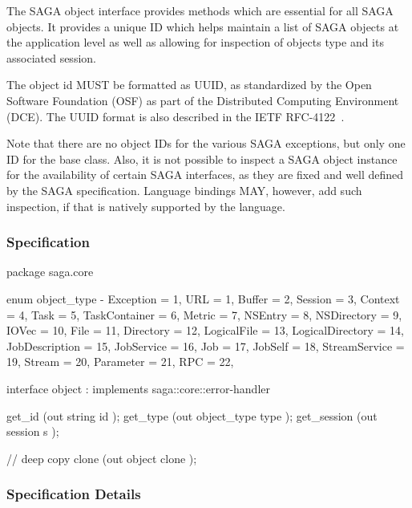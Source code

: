  
  The SAGA object interface provides methods which are essential
  for all SAGA objects.  It provides a unique ID which helps
  maintain a list of SAGA objects at the application level as
  well as allowing for inspection of objects type and its
  associated session.
        
  The object id MUST be formatted as UUID, as standardized by
  the Open Software Foundation (OSF) as part of the Distributed
  Computing Environment (DCE).  The UUID format is also
  described in the IETF RFC-4122~\cite{rfc-4122}.
 
  Note that there are no object IDs for the various
  SAGA exceptions, but only one ID for the 
  base class. Also, it is not possible to inspect a SAGA object
  instance for the availability of certain SAGA interfaces, as
  they are fixed and well defined by the SAGA specification.
  Language bindings MAY, however, add such inspection, if that
  is natively supported by the language.
 
 \subsubsection{Specification}
 
 \begin{myspec}
  package saga.core
  {
    enum object_type
    {
-     Exception        =   1,
      URL              =   1,
      Buffer           =   2,
      Session          =   3,
      Context          =   4,
      Task             =   5,
      TaskContainer    =   6,
      Metric           =   7,
      NSEntry          =   8,
      NSDirectory      =   9,
      IOVec            =  10,
      File             =  11,
      Directory        =  12,
      LogicalFile      =  13,
      LogicalDirectory =  14,
      JobDescription   =  15,
      JobService       =  16,
      Job              =  17,
      JobSelf          =  18,
      StreamService    =  19,
      Stream           =  20,
      Parameter        =  21,
      RPC              =  22,
    }
 
 
    interface object : implements saga::core::error-handler
    {
      get_id       (out string      id     );
      get_type     (out object_type type   );
      get_session  (out session     s      );
 
      // deep copy
      clone        (out object      clone  );
    }
  }
 \end{myspec}
 
 
 \subsubsection{Specification Details}
 
